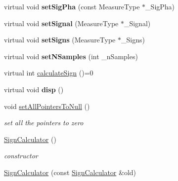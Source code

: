 \begin{DoxyCompactItemize}
\item 
\hypertarget{class_ox_1_1_sign_calculator_a1fe78e188915e35e8d0db885642852c9}{virtual void {\bfseries set\-Sig\-Pha} (const Measure\-Type $\ast$\-\_\-\-Sig\-Pha)}\label{class_ox_1_1_sign_calculator_a1fe78e188915e35e8d0db885642852c9}

\item 
\hypertarget{class_ox_1_1_sign_calculator_ade6aa249b05f92357cb825065be8a203}{virtual void {\bfseries set\-Signal} (Measure\-Type $\ast$\-\_\-\-Signal)}\label{class_ox_1_1_sign_calculator_ade6aa249b05f92357cb825065be8a203}

\item 
\hypertarget{class_ox_1_1_sign_calculator_a3de14f899f64c93df9076fb837e553bf}{virtual void {\bfseries set\-Signs} (Measure\-Type $\ast$\-\_\-\-Signs)}\label{class_ox_1_1_sign_calculator_a3de14f899f64c93df9076fb837e553bf}

\item 
\hypertarget{class_ox_1_1_sign_calculator_a8a4f3f8b94fad53d444cf6f1c1191497}{virtual void {\bfseries set\-N\-Samples} (int \-\_\-n\-Samples)}\label{class_ox_1_1_sign_calculator_a8a4f3f8b94fad53d444cf6f1c1191497}

\item 
virtual int \hyperlink{class_ox_1_1_sign_calculator_a6a85028b70e41f6a60a5b639c468e455}{calculate\-Sign} ()=0
\item 
\hypertarget{class_ox_1_1_sign_calculator_afc55176ad2a81085942e1e98242376bf}{virtual void {\bfseries disp} ()}\label{class_ox_1_1_sign_calculator_afc55176ad2a81085942e1e98242376bf}

\item 
\hypertarget{class_ox_1_1_sign_calculator_a59de754f72402b4cf7dc2f8766f0a1ff}{void \hyperlink{class_ox_1_1_sign_calculator_a59de754f72402b4cf7dc2f8766f0a1ff}{set\-All\-Pointers\-To\-Null} ()}\label{class_ox_1_1_sign_calculator_a59de754f72402b4cf7dc2f8766f0a1ff}

\begin{DoxyCompactList}\small\item\em set all the pointers to zero \end{DoxyCompactList}\item 
\hypertarget{class_ox_1_1_sign_calculator_a1b0a177a5f2c6080d6730ff5fdc384af}{\hyperlink{class_ox_1_1_sign_calculator_a1b0a177a5f2c6080d6730ff5fdc384af}{Sign\-Calculator} ()}\label{class_ox_1_1_sign_calculator_a1b0a177a5f2c6080d6730ff5fdc384af}

\begin{DoxyCompactList}\small\item\em constructor \end{DoxyCompactList}\item 
\hypertarget{class_ox_1_1_sign_calculator_a118469032ecb643b93ba56f948fdce85}{\hyperlink{class_ox_1_1_sign_calculator_a118469032ecb643b93ba56f948fdce85}{Sign\-Calculator} (const \hyperlink{class_ox_1_1_sign_calculator}{Sign\-Calculator} \&old)}\label{class_ox_1_1_sign_calculator_a118469032ecb643b93ba56f948fdce85}


\end{DoxyCompactItemize}
